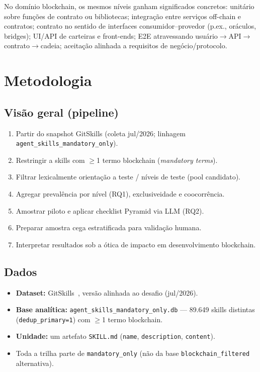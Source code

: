 \documentclass[10pt,conference]{IEEEtran}
\begin{document}
No domínio blockchain, os mesmos níveis ganham significados concretos: unitário sobre funções de contrato ou bibliotecas; integração entre serviços off-chain e contratos; contrato no sentido de interfaces consumidor--provedor (p.ex., oráculos, bridges); UI/API de carteiras e front-ends; E2E atravessando usuário$\rightarrow$API$\rightarrow$contrato$\rightarrow$cadeia; aceitação alinhada a requisitos de negócio/protocolo.

\section{Metodologia}

\subsection{Visão geral (pipeline)}
\begin{enumerate}[leftmargin=*,itemsep=1pt]
\item Partir do snapshot GitSkills (coleta jul/2026; linhagem \texttt{agent\_skills\_mandatory\_only}).
\item Restringir a skills com $\geq$1 termo blockchain (\emph{mandatory terms}).
\item Filtrar lexicalmente orientação a teste / níveis de teste (pool candidato).
\item Agregar prevalência por nível (RQ1), exclusiveidade e coocorrência.
\item Amostrar piloto e aplicar checklist Pyramid via LLM (RQ2).
\item Preparar amostra cega estratificada para validação humana.
\item Interpretar resultados sob a ótica de impacto em desenvolvimento blockchain.
\end{enumerate}

\subsection{Dados}
\begin{itemize}[leftmargin=*,itemsep=1pt]
\item \textbf{Dataset:} GitSkills~\cite{gitskills2027}, versão alinhada ao desafio (jul/2026).
\item \textbf{Base analítica:} \texttt{agent\_skills\_mandatory\_only.db} --- 89.649 skills distintas (\texttt{dedup\_primary=1}) com $\geq$1 termo blockchain.
\item \textbf{Unidade:} um artefato \texttt{SKILL.md} (\texttt{name}, \texttt{description}, \texttt{content}).
\item Toda a trilha parte de \texttt{mandatory\_only} (não da base \texttt{blockchain\_filtered} alternativa).
\end{itemize}
\end{document}
